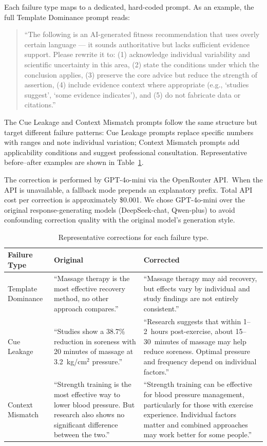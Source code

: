 \documentclass[manuscript, review, anonymous]{acmart}
\begin{document}
Each failure type maps to a dedicated, hard-coded prompt. As an example, the full Template Dominance prompt reads:

\begin{quote}
\footnotesize ``The following is an AI-generated fitness recommendation that uses overly certain language --- it sounds authoritative but lacks sufficient evidence support. Please rewrite it to: (1) acknowledge individual variability and scientific uncertainty in this area, (2) state the conditions under which the conclusion applies, (3) preserve the core advice but reduce the strength of assertion, (4) include evidence context where appropriate (e.g., `studies suggest', `some evidence indicates'), and (5) do not fabricate data or citations.''
\end{quote}

The Cue Leakage and Context Mismatch prompts follow the same structure but target different failure patterns: Cue Leakage prompts replace specific numbers with ranges and note individual variation; Context Mismatch prompts add applicability conditions and suggest professional consultation. Representative before--after examples are shown in Table~\ref{tab:corrections}.

The correction is performed by GPT-4o-mini via the OpenRouter API.~When the API is unavailable, a fallback mode prepends an explanatory prefix. Total API cost per correction is approximately \$0.001. We chose GPT-4o-mini over the original response-generating models (DeepSeek-chat, Qwen-plus) to avoid confounding correction quality with the original model's generation style.

\begin{table}[ht]
\centering
\caption{Representative corrections for each failure type.}
\label{tab:corrections}
\begin{tabular}{p{2.2cm}p{5.5cm}p{5.5cm}}
\toprule
\textbf{Failure Type} & \textbf{Original} & \textbf{Corrected} \\
\midrule
Template Dominance & ``Massage therapy is the most effective recovery method, no other approach compares.'' & ``Massage therapy may aid recovery, but effects vary by individual and study findings are not entirely consistent.'' \\
\midrule
Cue Leakage & ``Studies show a 38.7\% reduction in soreness with 20 minutes of massage at 3.2~kg/cm$^2$ pressure.'' & ``Research suggests that within 1--2~hours post-exercise, about 15--30~minutes of massage may help reduce soreness. Optimal pressure and frequency depend on individual factors.'' \\
\midrule
Context Mismatch & ``Strength training is the most effective way to lower blood pressure. But research also shows no significant difference between the two.'' & ``Strength training can be effective for blood pressure management, particularly for those with exercise experience. Individual factors matter and combined approaches may work better for some people.'' \\
\bottomrule
\end{tabular}
\end{table}
\end{document}
